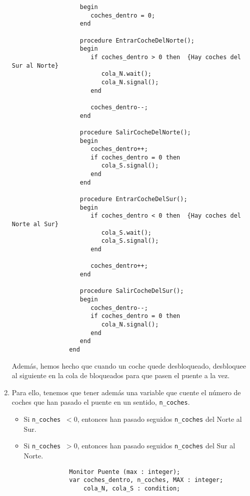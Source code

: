 \begin{ejercicio}
\begin{enumerate}
\begin{verbatim}
                   begin
                      coches_dentro = 0;
                   end

                   procedure EntrarCocheDelNorte();
                   begin
                      if coches_dentro > 0 then  {Hay coches del Sur al Norte}
                         cola_N.wait();
                         cola_N.signal();
                      end

                      coches_dentro--;
                   end

                   procedure SalirCocheDelNorte();
                   begin
                      coches_dentro++;
                      if coches_dentro = 0 then
                         cola_S.signal();
                      end
                   end

                   procedure EntrarCocheDelSur();
                   begin
                      if coches_dentro < 0 then  {Hay coches del Norte al Sur}
                         cola_S.wait();
                         cola_S.signal();
                      end

                      coches_dentro++;
                   end

                   procedure SalirCocheDelSur();
                   begin
                      coches_dentro--;
                      if coches_dentro = 0 then
                         cola_N.signal();
                      end
                   end
                end
            \end{verbatim}
            Además, hemos hecho que cuando un coche quede desbloqueado, desbloquee al siguiente en la cola de bloqueados para que pasen el puente a la vez.
        \item Para ello, tenemos que tener además una variable que cuente el número de coches que han pasado el puente en un sentido, \verb|n_coches|.
            \begin{itemize}
                \item Si \verb|n_coches| $\ <0$, entonces han pasado seguidos \verb|n_coches| del Norte al Sur.
                \item Si \verb|n_coches| $\ >0$, entonces han pasado seguidos \verb|n_coches| del Sur al Norte.
            \end{itemize}
            \begin{verbatim}
                Monitor Puente (max : integer);
                var coches_dentro, n_coches, MAX : integer;
                    cola_N, cola_S : condition;


\end{verbatim}
\end{enumerate}
\end{ejercicio}
